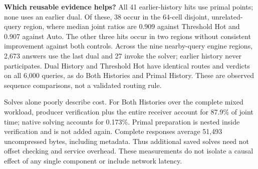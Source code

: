 \textbf{Which reusable evidence helps?} All 41 earlier-history hits use primal points; none uses an earlier dual. Of these, 38 occur in the 64-cell disjoint, unrelated-query region, where median joint ratios are 0.909 against Threshold Hot and 0.907 against Auto. The other three hits occur in two regions without consistent improvement against both controls. Across the nine nearby-query engine regions, 2,673 answers use the last dual and 27 invoke the solver; earlier history never participates. Dual History and Threshold Hot have identical routes and verdicts on all 6,000 queries, as do Both Histories and Primal History. These are observed sequence comparisons, not a validated routing rule.

Solves alone poorly describe cost. For Both Histories over the complete mixed workload, producer verification plus the entire receiver account for 87.9\% of joint time; native solving accounts for 0.173\%. Primal preparation is nested inside verification and is not added again. Complete responses average 51,493 uncompressed bytes, including metadata. Thus additional saved solves need not offset checking and service overhead. These measurements do not isolate a causal effect of any single component or include network latency.
